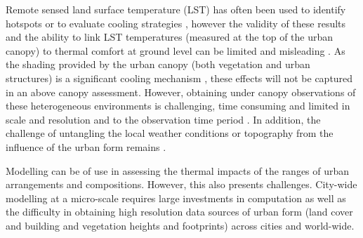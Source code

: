 \documentclass[final,3p,times,authoryear]{elsarticle}
\begin{document}
Remote 
sensed land surface temperature (LST) has often been used to identify hotspots \citep{Aniello1995} or to evaluate cooling strategies \citep{Zhu2012a,Duncan2018,Manoli2019,Ossola2021}, however the validity of these results and the ability to link LST temperatures (measured at the top of the urban canopy) to thermal comfort at ground level can be limited and misleading  \citep{Coutts2016d}. As the shading provided by the urban canopy (both vegetation and urban structures) is a significant cooling mechanism \citep{Coutts2015,Lee2018,Krayenhoff2021}, these effects will not be captured in an above canopy assessment. However, obtaining under canopy observations of these heterogeneous environments is challenging, time consuming and limited in scale and resolution and to the observation time period \citep{Middel2019a}. In addition, the challenge of untangling the local weather conditions or topography from the influence of the urban form remains \citep{Potgieter2021}.

Modelling can be of use in assessing the thermal impacts of the ranges of urban arrangements and compositions. However, this also presents challenges.  City-wide modelling at a micro-scale requires large investments in computation as well as the difficulty in obtaining high resolution data sources of urban form (land cover and building and vegetation heights and footprints) across cities and world-wide.
\end{document}
